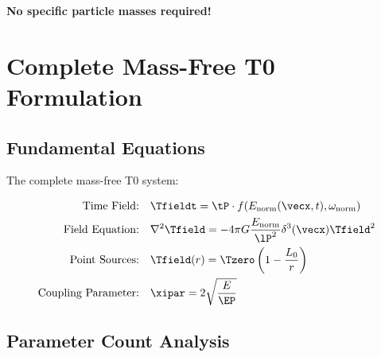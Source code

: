 	\textbf{No specific particle masses required!}
	
	\section{Complete Mass-Free T0 Formulation}
	\label{sec:complete_formulation}
	
	\subsection{Fundamental Equations}
	\label{subsec:fundamental_equations}
	
	The complete mass-free T0 system:
	
	\begin{tcolorbox}[colback=blue!5!white,colframe=blue!75!black,title=Mass-Free T0 Model]
		\begin{align}
			\text{Time Field:} \quad &\Tfieldt = \tP \cdot f(E_{\text{norm}}(\vecx,t), \omega_{\text{norm}}) \\
			\text{Field Equation:} \quad &\nabla^2 \Tfield = -4\pi G \frac{E_{\text{norm}}}{\lP^2} \delta^3(\vecx) \Tfield^2 \\
			\text{Point Sources:} \quad &\Tfield(r) = \Tzero\left(1 - \frac{L_0}{r}\right) \\
			\text{Coupling Parameter:} \quad &\xipar = 2\sqrt{\frac{E}{\EP}}
		\end{align}
	\end{tcolorbox}
	
	\subsection{Parameter Count Analysis}
	\label{subsec:parameter_count}
	
	\begin{center}
	\end{center}
	
